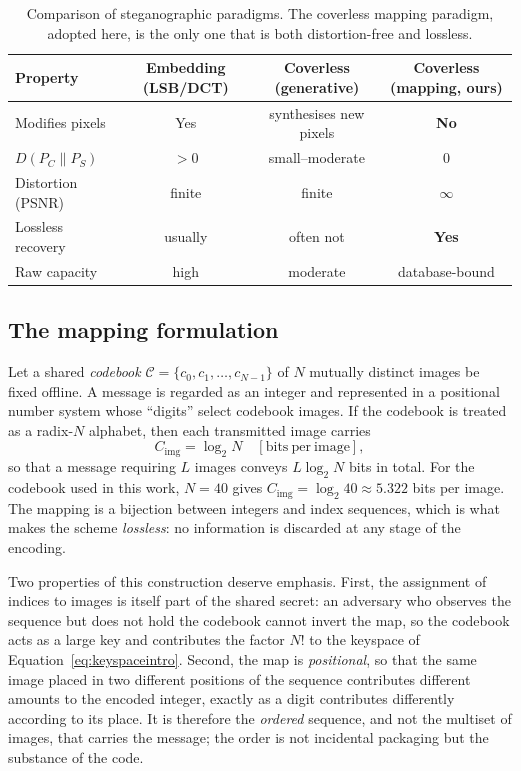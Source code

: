 \documentclass[11pt]{article}
\theoremstyle{definition}
\newcommand{\Eqn}[1]{Equation~\eqref{#1}}
\begin{document}
\begin{table}[H]
\centering
\caption{Comparison of steganographic paradigms. The coverless mapping paradigm,
adopted here, is the only one that is both distortion-free and lossless.}\label{tab:paradigms}
\begin{tabular}{@{}lccc@{}}
\toprule
Property & Embedding (LSB/DCT) & Coverless (generative) & Coverless (mapping, ours) \\
\midrule
Modifies pixels        & Yes & synthesises new pixels & \textbf{No} \\
$D(P_C\|P_S)$          & $>0$ & small--moderate & \textbf{$0$} \\
Distortion (PSNR)      & finite & finite & \textbf{$\infty$} \\
Lossless recovery      & usually & often not & \textbf{Yes} \\
Raw capacity           & high & moderate & database-bound \\
\bottomrule
\end{tabular}
\end{table}

\subsection{The mapping formulation}\label{sec:mapping}
Let a shared \emph{codebook} $\mathcal{C}=\{c_0,c_1,\dots,c_{N-1}\}$ of $N$
mutually distinct images be fixed offline. A message is regarded as an integer and
represented in a positional number system whose ``digits'' select codebook images.
If the codebook is treated as a radix-$N$ alphabet, then each transmitted image
carries
\begin{equation}
  C_{\text{img}} = \log_2 N \quad[\mathrm{bits\ per\ image}],
  \label{eq:capimg}
\end{equation}
so that a message requiring $L$ images conveys $L\log_2 N$ bits in total. For the
codebook used in this work, $N=40$ gives $C_{\text{img}}=\log_2 40\approx 5.322$
bits per image. The mapping is a bijection between integers and index sequences,
which is what makes the scheme \emph{lossless}: no information is discarded at any
stage of the encoding.

Two properties of this construction deserve emphasis. First, the assignment of
indices to images is itself part of the shared secret: an adversary who observes the
sequence but does not hold the codebook cannot invert the map, so the codebook acts
as a large key and contributes the factor $N!$ to the keyspace of
\Eqn{eq:keyspaceintro}. Second, the map is \emph{positional}, so that the same image
placed in two different positions of the sequence contributes different amounts to
the encoded integer, exactly as a digit contributes differently according to its
place. It is therefore the \emph{ordered} sequence, and not the multiset of images,
that carries the message; the order is not incidental packaging but the substance of
the code.
\end{document}
